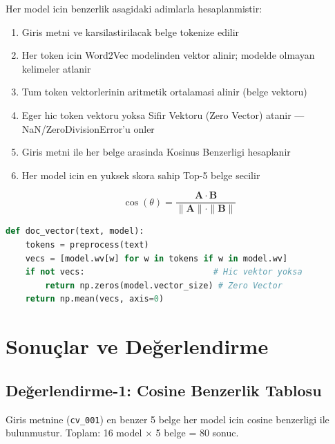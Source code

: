 \documentclass[12pt, a4paper]{article}
\begin{document}
Her model icin benzerlik asagidaki adimlarla hesaplanmistir:

\begin{enumerate}
    \item Giris metni ve karsilastirilacak belge tokenize edilir
    \item Her token icin Word2Vec modelinden vektor alinir; modelde olmayan kelimeler atlanir
    \item Tum token vektorlerinin aritmetik ortalamasi alinir (belge vektoru)
    \item Eger hic token vektoru yoksa Sifir Vektoru (Zero Vector) atanir --- NaN/ZeroDivisionError'u onler
    \item Giris metni ile her belge arasinda Kosinus Benzerligi hesaplanir
    \item Her model icin en yuksek skora sahip Top-5 belge secilir
\end{enumerate}

\begin{equation}
\cos(\theta) = \frac{\mathbf{A} \cdot \mathbf{B}}{\|\mathbf{A}\| \cdot \|\mathbf{B}\|}
\end{equation}

\begin{lstlisting}[style=kod, language=Python, caption={Belge Vektoru + Zero Vector Savunma Mekanizmasi}]
def doc_vector(text, model):
    tokens = preprocess(text)
    vecs = [model.wv[w] for w in tokens if w in model.wv]
    if not vecs:                          # Hic vektor yoksa
        return np.zeros(model.vector_size) # Zero Vector
    return np.mean(vecs, axis=0)
\end{lstlisting}


\section{Sonuçlar ve Değerlendirme}

\subsection{Değerlendirme-1: Cosine Benzerlik Tablosu}

Giris metnine (\texttt{cv\_001}) en benzer 5 belge her model icin cosine benzerligi ile bulunmustur.
Toplam: 16 model $\times$ 5 belge = 80 sonuc.
\end{document}
